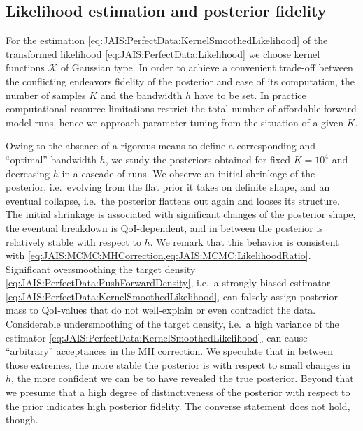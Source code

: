 \subsection{Likelihood estimation and posterior fidelity} \label{sec:JAIS:Analysis:LikelihoodEstimation}
For the estimation \cref{eq:JAIS:PerfectData:KernelSmoothedLikelihood} of the transformed likelihood \cref{eq:JAIS:PerfectData:Likelihood} we choose kernel functions \(\mathcal{K}\) of Gaussian type.
In order to achieve a convenient trade-off between the conflicting endeavors fidelity of the posterior and ease of its computation, the number of samples \(K\) and the bandwidth \(h\) have to be set.
In practice computational resource limitations restrict the total number of affordable forward model runs, hence we approach parameter tuning from the situation of a given \(K\).
\par %
Owing to the absence of a rigorous means to define a corresponding and ``optimal''  bandwidth \(h\), we study the posteriors obtained for fixed \(K=10^4\) and decreasing \(h\) in a cascade of runs.
We observe an initial shrinkage of the posterior, i.e.\ evolving from the flat prior it takes on definite shape, and an eventual collapse, i.e.\ the posterior flattens out again and looses its structure.
The initial shrinkage is associated with significant changes of the posterior shape, the eventual breakdown is QoI-dependent, and in between the posterior is relatively stable with respect to \(h\).
We remark that this behavior is consistent with \cref{eq:JAIS:MCMC:MHCorrection,eq:JAIS:MCMC:LikelihoodRatio}.
Significant oversmoothing the target density \cref{eq:JAIS:PerfectData:PushForwardDensity}, i.e.\ a strongly biased estimator \cref{eq:JAIS:PerfectData:KernelSmoothedLikelihood},
can falsely assign posterior mass to QoI-values that do not well-explain or even contradict the data.
Considerable undersmoothing of the target density, i.e.\ a high variance of the estimator \cref{eq:JAIS:PerfectData:KernelSmoothedLikelihood}, can cause ``arbitrary'' acceptances in the MH correction.
We speculate that in between those extremes, the more stable the posterior is with respect to small changes in \(h\), the more confident we can be to have revealed the true posterior.
Beyond that we presume that a high degree of distinctiveness of the posterior with respect to the prior indicates high posterior fidelity.
The converse statement does not hold, though.
